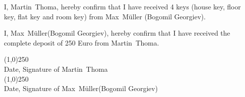 \documentclass[a4paper]{scrartcl}
\newcommand{\HauptmieterVorname}{Martin}                            %
\newcommand{\HauptmieterNachname}{Thoma}                            %
\newcommand{\UntermieterVorname}{Max}                               %
\newcommand{\UntermieterNachname}{Müller}                           %
\begin{document}
I, \HauptmieterVorname~\HauptmieterNachname, hereby confirm that I have received 4 keys (house key,
floor key, flat key and room key) from \UntermieterVorname~\UntermieterNachname 
(Bogomil Georgiev).

I, \UntermieterVorname~\UntermieterNachname (Bogomil Georgiev), hereby confirm that I have received the complete deposit of 250 Euro from \HauptmieterVorname~\HauptmieterNachname.

\vspace{1.5cm}
\line(1,0){250}\\
\vspace{-0.3cm}
{\scriptsize Date, Signature of \HauptmieterVorname~\HauptmieterNachname}\\


\vspace{1cm}
\line(1,0){250}\\
\vspace{-0.3cm}
{\scriptsize Date, Signature of \UntermieterVorname~\UntermieterNachname (Bogomil Georgiev)}\\
\end{document}
